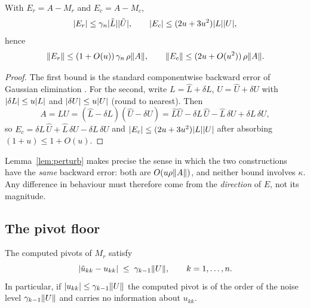 \begin{lemma}\label{lem:perturb}
With $E_r=A-M_r$ and $E_c=A-M_c$,
\begin{equation}
  \lvert E_r \rvert\le\gamma_{n}\lvert \tilde L \rvert\lvert \tilde U \rvert,
  \qquad
  \lvert E_c \rvert\le(2u+3u^2)\lvert L \rvert\lvert U \rvert,
\end{equation}
hence
\begin{equation}\label{eq:same-backward}
  \lVert E_r \rVert\le(1+O(u))\,\gamma_n\,\rho\lVert A \rVert,
  \qquad
  \lVert E_c \rVert\le(2u+O(u^2))\,\rho\lVert A \rVert.
\end{equation}
\end{lemma}

\begin{proof}
The first bound is the standard componentwise backward error of Gaussian
elimination \cite{higham2002,ch2018}. For the second, write
$L=\hat L+\delta L$, $U=\hat U+\delta U$ with $\lvert \delta L \rvert\le u\lvert L \rvert$ and
$\lvert \delta U \rvert\le u\lvert U \rvert$ (round to nearest). Then
\[
  A=LU=(\hat L-\delta L)(\hat U-\delta U)
   =\hat L\hat U-\delta L\,\hat U-\hat L\,\delta U+\delta L\,\delta U ,
\]
so $E_c=\delta L\,\hat U+\hat L\,\delta U-\delta L\,\delta U$ and
$\lvert E_c \rvert\le(2u+3u^2)\lvert L \rvert\lvert U \rvert$ after absorbing $(1+u)\le 1+O(u)$.
\end{proof}

\begin{remark}\label{rem:same}
Lemma~\ref{lem:perturb} makes precise the sense in which the two constructions
have the \emph{same} backward error: both are $O(u\rho\lVert A \rVert)$, and neither
bound involves $\kappa$. Any difference in behaviour must therefore come from the
\emph{direction} of $E$, not its magnitude.
\end{remark}

\subsection{The pivot floor}

\begin{lemma}\label{lem:floor}
The computed pivots of $M_r$ satisfy
\begin{equation}\label{eq:floor}
  \lvert \tilde u_{kk}-u_{kk} \rvert\;\le\;\gamma_{k-1}\lVert U \rVert,
  \qquad k=1,\dots,n .
\end{equation}
In particular, if $\lvert u_{kk} \rvert\le\gamma_{k-1}\lVert U \rVert$ the computed pivot is of
the order of the noise level $\gamma_{k-1}\lVert U \rVert$ and carries no information
about $u_{kk}$.
\end{lemma}

